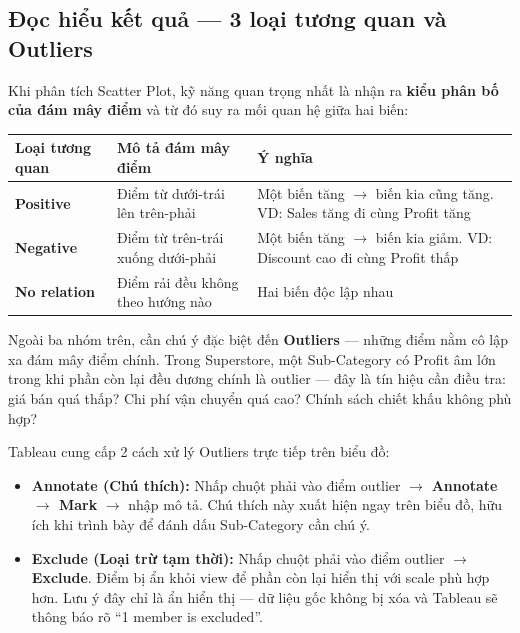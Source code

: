 \documentclass[12pt]{article}
\begin{document}
\subsection{Đọc hiểu kết quả --- 3 loại tương quan và Outliers}

\noindent Khi phân tích Scatter Plot, kỹ năng quan trọng nhất là nhận ra \textbf{kiểu phân bố của đám mây điểm} và từ đó suy ra mối quan hệ giữa hai biến:

\begin{center}
\renewcommand{\arraystretch}{1.4}
\begin{tabularx}{\linewidth}{>{\raggedright\arraybackslash}p{3cm} X X}
\toprule
\textbf{Loại tương quan} & \textbf{Mô tả đám mây điểm} & \textbf{Ý nghĩa} \\
\midrule
\textbf{Positive} & Điểm từ dưới-trái lên trên-phải & Một biến tăng $\rightarrow$ biến kia cũng tăng. VD: Sales tăng đi cùng Profit tăng \\
\textbf{Negative} & Điểm từ trên-trái xuống dưới-phải & Một biến tăng $\rightarrow$ biến kia giảm. VD: Discount cao đi cùng Profit thấp \\
\textbf{No relation} & Điểm rải đều không theo hướng nào & Hai biến độc lập nhau \\
\bottomrule
\end{tabularx}
\end{center}

\noindent Ngoài ba nhóm trên, cần chú ý đặc biệt đến \textbf{Outliers} --- những điểm nằm cô lập xa đám mây điểm chính. Trong Superstore, một Sub-Category có Profit âm lớn trong khi phần còn lại đều dương chính là outlier --- đây là tín hiệu cần điều tra: giá bán quá thấp? Chi phí vận chuyển quá cao? Chính sách chiết khấu không phù hợp?

\noindent Tableau cung cấp 2 cách xử lý Outliers trực tiếp trên biểu đồ:
\begin{itemize}[nosep]
    \item \textbf{Annotate (Chú thích):} Nhấp chuột phải vào điểm outlier $\rightarrow$ \textbf{Annotate $\rightarrow$ Mark} $\rightarrow$ nhập mô tả. Chú thích này xuất hiện ngay trên biểu đồ, hữu ích khi trình bày để đánh dấu Sub-Category cần chú ý.
    \item \textbf{Exclude (Loại trừ tạm thời):} Nhấp chuột phải vào điểm outlier $\rightarrow$ \textbf{Exclude}. Điểm bị ẩn khỏi view để phần còn lại hiển thị với scale phù hợp hơn. Lưu ý đây chỉ là ẩn hiển thị --- dữ liệu gốc không bị xóa và Tableau sẽ thông báo rõ ``1 member is excluded''.
\end{itemize}
\end{document}
